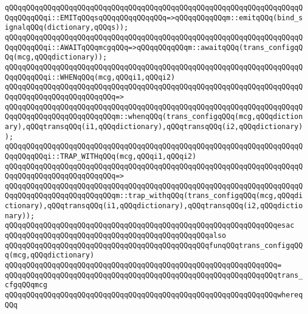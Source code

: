 \newline
\verb|qQQqqQQqqQQqqQQqqQQqqQQqqQQqqQQqqQQqqQQqqQQqqQQqqQQqqQQqqQQqqQQqqQQqqQQqqQQqqQQqi::EMITqQQqsqQQqqQQqqQQqqQQq=>qQQqqQQqqQQqm::emitqQQq(bind_signalqQQq(dictionary,qQQqs));|\newline
\verb|qQQqqQQqqQQqqQQqqQQqqQQqqQQqqQQqqQQqqQQqqQQqqQQqqQQqqQQqqQQqqQQqqQQqqQQqqQQqqQQqi::AWAITqQQqmcgqQQq=>qQQqqQQqqQQqm::awaitqQQq(trans_configqQQq(mcg,qQQqdictionary));|\newline
\newline
\verb|qQQqqQQqqQQqqQQqqQQqqQQqqQQqqQQqqQQqqQQqqQQqqQQqqQQqqQQqqQQqqQQqqQQqqQQqqQQqqQQqi::WHENqQQq(mcg,qQQqi1,qQQqi2)|\newline
\verb|qQQqqQQqqQQqqQQqqQQqqQQqqQQqqQQqqQQqqQQqqQQqqQQqqQQqqQQqqQQqqQQqqQQqqQQqqQQqqQQqqQQqqQQqqQQqqQQq=>|\newline
\verb|qQQqqQQqqQQqqQQqqQQqqQQqqQQqqQQqqQQqqQQqqQQqqQQqqQQqqQQqqQQqqQQqqQQqqQQqqQQqqQQqqQQqqQQqqQQqqQQqm::whenqQQq(trans_configqQQq(mcg,qQQqdictionary),qQQqtransqQQq(i1,qQQqdictionary),qQQqtransqQQq(i2,qQQqdictionary));|\newline
\newline
\verb|qQQqqQQqqQQqqQQqqQQqqQQqqQQqqQQqqQQqqQQqqQQqqQQqqQQqqQQqqQQqqQQqqQQqqQQqqQQqqQQqi::TRAP_WITHqQQq(mcg,qQQqi1,qQQqi2)|\newline
\verb|qQQqqQQqqQQqqQQqqQQqqQQqqQQqqQQqqQQqqQQqqQQqqQQqqQQqqQQqqQQqqQQqqQQqqQQqqQQqqQQqqQQqqQQqqQQqqQQq=>|\newline
\verb|qQQqqQQqqQQqqQQqqQQqqQQqqQQqqQQqqQQqqQQqqQQqqQQqqQQqqQQqqQQqqQQqqQQqqQQqqQQqqQQqqQQqqQQqqQQqqQQqm::trap_withqQQq(trans_configqQQq(mcg,qQQqdictionary),qQQqtransqQQq(i1,qQQqdictionary),qQQqtransqQQq(i2,qQQqdictionary));|\newline
\verb|qQQqqQQqqQQqqQQqqQQqqQQqqQQqqQQqqQQqqQQqqQQqqQQqqQQqqQQqqQQqqQQqesac|\newline
\newline
\newline
\verb|qQQqqQQqqQQqqQQqqQQqqQQqqQQqqQQqqQQqqQQqqQQqqQQqalso|\newline
\verb|qQQqqQQqqQQqqQQqqQQqqQQqqQQqqQQqqQQqqQQqqQQqqQQqfunqQQqtrans_configqQQq(mcg,qQQqdictionary)|\newline
\verb|qQQqqQQqqQQqqQQqqQQqqQQqqQQqqQQqqQQqqQQqqQQqqQQqqQQqqQQqqQQqqQQq=|\newline
\verb|qQQqqQQqqQQqqQQqqQQqqQQqqQQqqQQqqQQqqQQqqQQqqQQqqQQqqQQqqQQqqQQqtrans_cfgqQQqmcg|\newline
\verb|qQQqqQQqqQQqqQQqqQQqqQQqqQQqqQQqqQQqqQQqqQQqqQQqqQQqqQQqqQQqqQQqwhereqQQq|\newline
